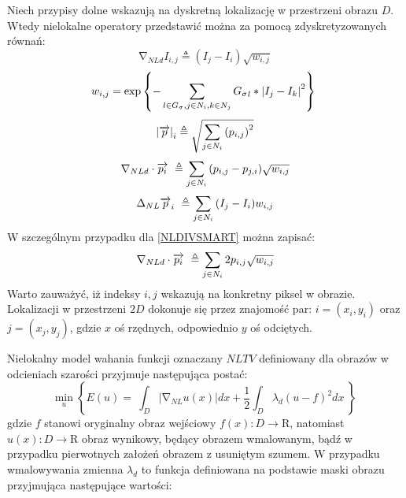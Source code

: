\documentclass[12pt, twoside, openany]{report}
\theoremstyle{definition}
\begin{document}
Niech przypisy dolne wskazują na dyskretną lokalizację w przestrzeni obrazu $D$. Wtedy nielokalne operatory przedstawić można za pomocą zdyskretyzowanych równań:
\begin{equation}
{\mathrm{\nabla }}_{NLd}I_{i,j}\triangleq \left(I_j-I_i\right)\sqrt{w_{i,j}}
\label{DNLGRAD}
\end{equation}
\begin{equation}
w_{i,j}={\mathrm{exp} \left\{-\sum_{l\in G_{\sigma },j\in N_i,k\in N_j \\
}{{G_{\sigma }}_l\ast {\left|I_j-I_k\right|}^2}\right\}\ }
\label{DNLWEIGHT}
\end{equation}
\begin{equation}
{\left|\overrightarrow{p}\right|}_i\triangleq \sqrt{\sum_{j\in N_i \\ 
}{{\left(p_{i,j}\right)}^2}}
\label{DNLMAG}
\end{equation}
\begin{equation}
{\mathrm{\nabla }}_{NLd}\cdot \overrightarrow{p_i}\ \triangleq \sum_{ 
j\in N_i \\ 
}{\left(p_{i,j}-p_{j,i}\right)}\sqrt{w_{i,j}}
\label{DNLDIV}
\end{equation}
\begin{equation}
{\mathrm{\Delta }}_{NL}{\overrightarrow{p}}_i\ \triangleq \sum_{
j\in N_i \\ 
}{\left(I_j-I_i\right)}w_{i,j}
\label{DNLLAP}
\end{equation}
W szczególnym przypadku dla \eqref{NLDIVSMART} można zapisać:
\begin{equation}
{\mathrm{\nabla }}_{NLd}\cdot \overrightarrow{p_i}\ \triangleq \sum_{ 
j\in N_i \\ 
}{2p_{i,j}}\sqrt{w_{i,j}}
\label{DNLDIVSMART}
\end{equation}
Warto zauważyć, iż indeksy $i,j$ wskazują na konkretny piksel w obrazie. Lokalizacji w przestrzeni $2D$ dokonuje się przez znajomość par: $i=(x_i,y_i)$ oraz $j=(x_j,y_j)$, gdzie $x$ oś rzędnych, odpowiednio $y$ oś odciętych.
\par 
Nielokalny model wahania funkcji oznaczany $NLTV$ definiowany dla obrazów w odcieniach szarości przyjmuje następująca postać:
\begin{equation}
{\mathop{\mathrm{min}}_{u} \left\{E\left(u\right)=\ \int_D{\left|{\mathrm{\nabla }}_{NL}u(x)\right|}dx+\frac{1}{2}\int_D{{\lambda }_d{\left(u-f\right)}^2}dx\ \right\}\ }
\label{NLTVGRAY}
\end{equation}
gdzie $f$ stanowi oryginalny obraz wejściowy $f\left(x\right):D\mathrm{\longrightarrow }\mathrm{R}$, natomiast $u\left(x\right):D\mathrm{\longrightarrow }\mathrm{R}$ obraz wynikowy, będący obrazem wmalowanym, bądź w przypadku pierwotnych założeń obrazem z usuniętym szumem. W przypadku wmalowywania zmienna ${\lambda }_d$ to funkcja definiowana na podstawie maski obrazu przyjmująca następujące wartości:
\end{document}
